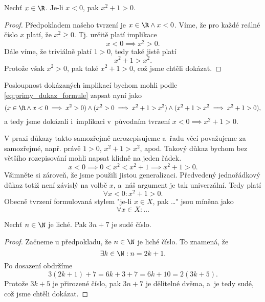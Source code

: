 \begin{proposition}
    Nechť $x\in\R$. Je-li $x<0$, pak $x^2+1>0$.
\end{proposition}
\begin{proof}
    Předpokladem našeho tvrzení je $x\in\R \land x<0$. Víme, že pro každé reálné číslo $x$ platí, že $x^2\geq 0$. Tj. určitě platí implikace
    \begin{equation*}
        x<0 \implies x^2>0.
    \end{equation*}
    Dále víme, že triviálně platí $1>0$, tedy také jistě platí
    \begin{equation*}
        x^2+1>x^2.
    \end{equation*}
    Protože však $x^2>0$, pak také
    $x^2+1>0$, což jsme chtěli dokázat.
\end{proof}
Posloupnost dokázaných implikací bychom mohli podle \eqref{eq:primy_dukaz_formule} zapsat nyní jako
\begin{equation*}
    (x\in\R \land x<0 \implies x^2>0) \land (x^2>0 \implies x^2+1>x^2) \land (x^2+1>x^2 \implies x^2+1>0),
\end{equation*}
a tedy jsme dokázali i~implikaci v~původním tvrzení $x<0 \implies x^2+1>0$.\par
V praxi důkazy takto samozřejmě nerozepisujeme a~řadu věcí považujeme za samozřejmé, např. právě $1>0$, $x^2+1>x^2$, apod. Takový důkaz bychom bez většího rozepisování mohli napsat klidně na jeden řádek.
\begin{equation*}
    x<0 \implies 0<x^2<x^2+1 \implies x^2+1>0.
\end{equation*}
Všimněte si zároveň, že jsme použili jistou generalizaci. Předvedený jednořádkový důkaz totiž není závislý na volbě $x$, a~náš argument je tak univerzální. Tedy platí
\begin{equation*}
    \forall x<0: x^2+1>0.
\end{equation*}
Obecně tvrzení formulovaná stylem "je-li $x\in X$, pak \dots" jsou míněna jako
\begin{equation*}
    \forall x\in X: \dots
\end{equation*}
\begin{proposition}
    Nechť $n\in\N$ je liché. Pak $3n+7$ je sudé číslo.
\end{proposition}
\begin{proof}
    Začneme u předpokladu, že $n\in\N$ je liché číslo. To znamená, že
    \begin{equation*}
        \exists k\in\N : n=2k+1.
    \end{equation*}
    Po dosazení obdržíme
    \begin{equation*}
        3(2k+1)+7=6k+3+7=6k+10=2(3k+5).
    \end{equation*}
    Protože $3k+5$ je přirozené číslo, pak $3n+7$ je dělitelné dvěma, a~je tedy sudé, což jsme chtěli dokázat.
\end{proof}
